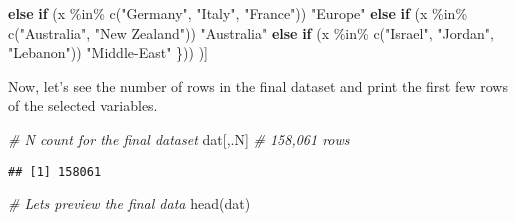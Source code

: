 \documentclass[
]{book}
\newenvironment{Shaded}{\begin{snugshade}}{\end{snugshade}}
\newcommand{\CommentTok}[1]{\textcolor[rgb]{0.56,0.35,0.01}{\textit{#1}}}
\newcommand{\ControlFlowTok}[1]{\textcolor[rgb]{0.13,0.29,0.53}{\textbf{#1}}}
\newcommand{\FunctionTok}[1]{\textcolor[rgb]{0.00,0.00,0.00}{#1}}
\newcommand{\NormalTok}[1]{#1}
\newcommand{\SpecialCharTok}[1]{\textcolor[rgb]{0.00,0.00,0.00}{#1}}
\newcommand{\StringTok}[1]{\textcolor[rgb]{0.31,0.60,0.02}{#1}}
\begin{document}
\begin{Shaded}
\begin{Highlighting}[]
    \ControlFlowTok{else} \ControlFlowTok{if}\NormalTok{ (x }\SpecialCharTok{\%in\%} \FunctionTok{c}\NormalTok{(}\StringTok{"Germany"}\NormalTok{, }\StringTok{"Italy"}\NormalTok{, }\StringTok{"France"}\NormalTok{)) }\StringTok{"Europe"}
    \ControlFlowTok{else} \ControlFlowTok{if}\NormalTok{ (x }\SpecialCharTok{\%in\%} \FunctionTok{c}\NormalTok{(}\StringTok{"Australia"}\NormalTok{, }\StringTok{"New Zealand"}\NormalTok{)) }\StringTok{"Australia"}
    \ControlFlowTok{else} \ControlFlowTok{if}\NormalTok{ (x }\SpecialCharTok{\%in\%} \FunctionTok{c}\NormalTok{(}\StringTok{"Israel"}\NormalTok{, }\StringTok{"Jordan"}\NormalTok{, }\StringTok{"Lebanon"}\NormalTok{)) }\StringTok{"Middle{-}East"}
\NormalTok{    \}))}
\NormalTok{  )]}
\end{Highlighting}
\end{Shaded}

Now, let's see the number of rows in the final dataset and print the first few rows of the selected variables.

\begin{Shaded}
\begin{Highlighting}[]
\CommentTok{\# N count for the final dataset}
\NormalTok{dat[,.N] }\CommentTok{\# 158,061 rows}
\end{Highlighting}
\end{Shaded}

\begin{verbatim}
## [1] 158061
\end{verbatim}

\begin{Shaded}
\begin{Highlighting}[]
\CommentTok{\# Let\textquotesingle{}s preview the final data}
\FunctionTok{head}\NormalTok{(dat)}
\end{Highlighting}
\end{Shaded}
\end{document}

